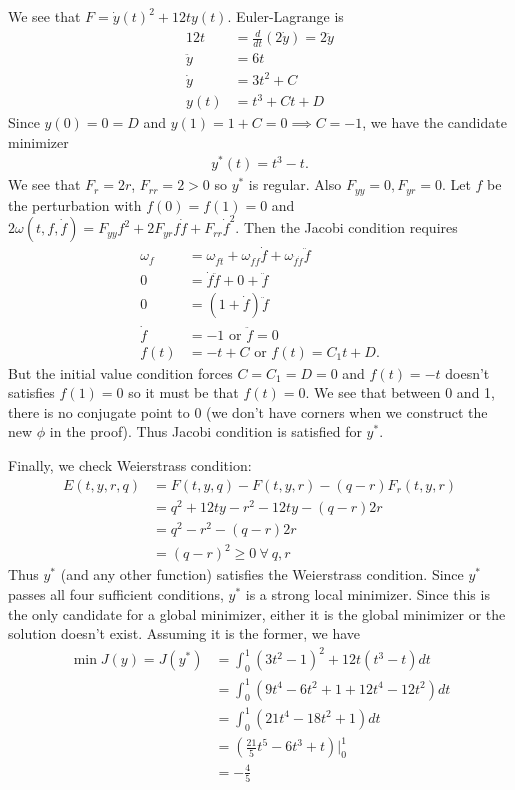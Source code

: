 \documentclass[12pt]{article}
\begin{document}
\begin{problem}[5]
We see that $ F = \dot{y}(t)^2+12ty(t)$. Euler-Lagrange is
\begin{align*}
	12t &= \frac{d}{dt} (2\dot{y})= 2\ddot{y} \\
	\ddot{y} &= 6t \\
	\dot{y} &= 3t^2+C \\
	y(t) &= t^3+Ct+D 
\end{align*}
Since $ y(0) = 0 = D$ and  $ y(1) = 1+C = 0 \implies C=-1$, we have the candidate minimizer
\begin{align*}
	y^*(t) = t^3-t.
\end{align*}
We see that $ F_r = 2r$,  $ F_{r r} = 2 >0$ so $ y^* $ is regular. Also $ F_{yy}=0, F_{yr}=0$. Let $ f$ be the perturbation with $ f(0)=f(1)=0$ and $ 2 \omega(t, f, \dot{f}) = F_{yy} f^2 + 2F_{yr} f \dot{f} + F_{rr} \dot{f}^2$. Then the Jacobi condition requires
\begin{align*}
	\omega_f &= \omega_{\dot{f} t} + \omega_{\dot{f} f} \dot{f} + \omega_{\dot{f}\dot{f}} \ddot{f} \\
	0 &= \dot{f} \ddot{f} + 0+ \ddot{f} \\
	0&= (1+\dot{f}) \ddot{f} \\
	\dot{f} &= -1 \text{ or } \ddot{f} =0\\
	f(t) &= -t + C \text{ or } f(t) = C_1t +D. 
\end{align*}
But the initial value condition forces $ C=C_1=D=0$ and $ f(t) =-t$ doesn't satisfies  $ f(1)=0$ so it must be that  $ f(t) =0$. We see that between 0 and 1, there is no conjugate point to 0 (we don't have corners when we construct the new $ \phi$ in the proof). Thus Jacobi condition is satisfied for $ y^* $.

Finally, we check Weierstrass condition:
\begin{align*}
	E(t,y,r,q)&= F(t,y,q)-F(t,y,r) -(q-r)F_r(t,y,r) \\ 
	&= q^2+12ty-r^2-12ty - (q-r)2r \\
	&= q^2-r^2-(q-r)2r \\
	&= (q-r)^2 \geq 0 \ \forall \ q,r
\end{align*}
Thus $ y^* $ (and any other function) satisfies the Weierstrass condition. Since $ y^* $ passes all four sufficient conditions, $ y^* $ is a strong local minimizer. Since this is the only candidate for a global minimizer, either it is the global minimizer or the solution doesn't exist. Assuming it is the former, we have
\begin{align*}
	\min J(y) = J(y^* ) &= \int_{ 0}^{ 1} (3t^2-1)^2 +12t(t^3-t) dt \\
	&=\int_{ 0}^{ 1} ( 9t^{4}-6t^2+1 +12 t^{4} - 12 t^2)dt  \\
	&=\int_{ 0}^{ 1} (  21t^{4} -18t^2 + 1) dt \\
	&= \left( \frac{21}{5}t^{5}-6t^{3}+t \right) \bigg|_0^1 \\
	&= -\frac{4}{5} 
\end{align*}
\end{problem}
\end{document}
